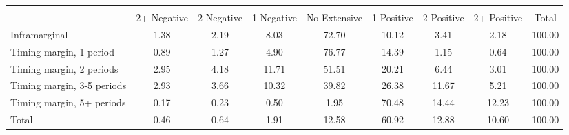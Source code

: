 \begin{tabular}{l*{8}{c}}
\hline\hline
                    &\multicolumn{8}{c}{}                                                                                   \\
                    & 2+ Negative&  2 Negative&  1 Negative&No Extensive&  1 Positive&  2 Positive& 2+ Positive&       Total\\
\hline
Inframarginal       &        1.38&        2.19&        8.03&       72.70&       10.12&        3.41&        2.18&      100.00\\
Timing margin, 1 period&        0.89&        1.27&        4.90&       76.77&       14.39&        1.15&        0.64&      100.00\\
Timing margin, 2 periods&        2.95&        4.18&       11.71&       51.51&       20.21&        6.44&        3.01&      100.00\\
Timing margin, 3-5 periods&        2.93&        3.66&       10.32&       39.82&       26.38&       11.67&        5.21&      100.00\\
Timing margin, 5+ periods&        0.17&        0.23&        0.50&        1.95&       70.48&       14.44&       12.23&      100.00\\
Total               &        0.46&        0.64&        1.91&       12.58&       60.92&       12.88&       10.60&      100.00\\
\hline\hline
\end{tabular}

